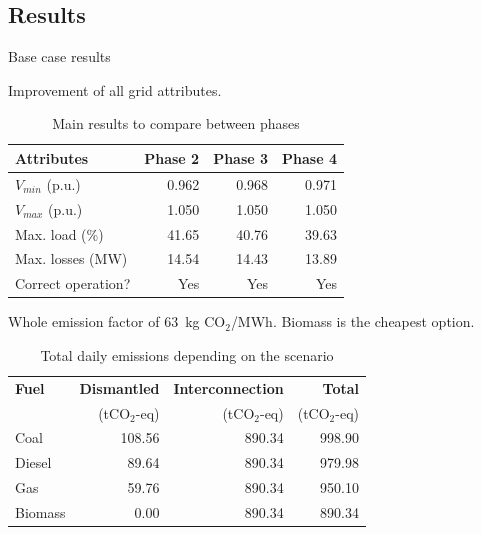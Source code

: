   \subsection{Results}
  \begin{frame}{Base case results}


    Improvement of all grid attributes.
\begin{table}[!htb]\centering\footnotesize
  \begin{tabular}{lrrr}
    \hline
    \textbf{Attributes} & \textbf{Phase 2} & \textbf{Phase 3} & \textbf{Phase 4}\\
    \hline
    $V_{min}$ (p.u.) & 0.962 & 0.968 & 0.971 \\
    $V_{max}$ (p.u.) & 1.050 & 1.050 & 1.050 \\
    Max. load (\%) & 41.65 & 40.76 & 39.63 \\
    Max. losses (MW) & 14.54 & 14.43 & 13.89 \\
    Correct operation? & Yes & Yes & Yes \\
    \hline
  \end{tabular}
  \caption{Main results to compare between phases}
  \label{tab:compare2}
\end{table}


Whole emission factor of 63~kg CO$_2$/MWh. Biomass is the cheapest option.

\begin{table}[!htb]\centering\footnotesize
  \begin{tabular}{lrrr}
    \hline
    \textbf{Fuel} & \textbf{Dismantled} & \textbf{Interconnection} & \textbf{Total} \\
    & (tCO$_2$-eq) &  (tCO$_2$-eq)  &  (tCO$_2$-eq) \\
    \hline
    Coal & 108.56 & 890.34 & 998.90 \\
    Diesel & 89.64 & 890.34 & 979.98 \\
    Gas & 59.76 & 890.34 & 950.10 \\
    Biomass & 0.00 & 890.34 & 890.34 \\
    \hline
  \end{tabular}
  \caption{Total daily emissions depending on the scenario}
  \label{tab:emit}
\end{table}

  \end{frame}


